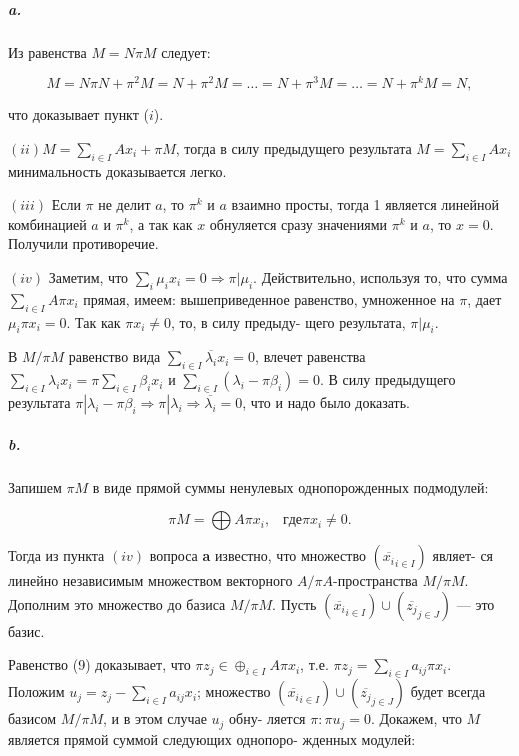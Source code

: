 \documentclass{mai_book}
\begin{document}
{\subparagraph{a.} Из равенства $M = N \pi M$ следует:

\begin{equation*}
M = N \pi N + \pi^{2}M = N + \pi^{2}M =\dots= N + \pi^{3}M=\dots= N + \pi^{k}M = N,
\end{equation*}

\noindent что доказывает пункт ($i$).

$(ii) M = \sum_{i \in I}Ax_{i} + \pi M$, тогда в силу предыдущего результата
$M = \sum_{i \in I}Ax_{i}$ минимальность доказывается легко.

$(iii)$ Если $\pi$ не делит $a$, то $\pi^{k}$ и $a$ взаимно просты, тогда 1 является
линейной комбинацией $a$ и $\pi^{k}$, а так как $x$ обнуляется сразу значениями
$\pi^{k}$ и $a$, то $x = 0$. Получили противоречие.

$(iv)$ Заметим, что $\sum_{i}\mu_{i}x_{i} = 0 \Rightarrow \pi | \mu_{i}$. Действительно, используя
то, что сумма $\sum_{i \in I}A\pi x_{i}$ прямая, имеем: вышеприведенное равенство,
умноженное на $\pi$, дает $\mu_{i}\pi x_{i} = 0$. Так как $\pi x_{i} \neq 0$, то, в силу предыду-
щего результата, $\pi | \mu_{i}$.

В $M/\pi M$ равенство вида $\sum_{i \in I}\overline{\lambda_{i}}x_{i} = 0$, влечет равенства
$\sum_{i \in I}\lambda_{i}x_{i} = \pi\sum_{i \in I}\beta_{i}x_{i}$ и $\sum_{i \in I}(\lambda_{i} - \pi\beta_{i}) = 0$. В силу предыдущего
результата $\pi |\lambda_{i} - \pi\beta_{i} \Rightarrow \pi| \lambda_{i} \Rightarrow \overline{\lambda_{i}} = 0$, что и надо было доказать.

\subparagraph{b.} Запишем $\pi M$ в виде прямой суммы ненулевых однопорожденных
подмодулей:

\begin{equation}
\pi M = \bigoplus A\pi x_{i},\;\;\; где \pi x_{i} \neq 0.
\end{equation}

\noindent Тогда из пункта $(iv)$ вопроса {\bf a} известно, что множество $(\overline{x_{i}}_{i \in I})$ являет-
ся линейно независимым множеством векторного $A/\pi A$-пространства
$M/\pi M$. Дополним это множество до базиса $M/\pi M$. Пусть
$(\overline{x_{i}}_{i \in I}) \cup (\overline{z_{j}}_{j \in J})$ --- это базис.

Равенство (9) доказывает, что $\pi z_{j} \in \oplus_{i \in I}A\pi x_{i}$, т.е.
$\pi z_{j} = \sum_{i \in I}a_{ij}\pi x_{i}$. Положим $u_{j} = z_{j} - \sum_{i \in I}a_{ij}x_{i}$; множество
$(\overline{x_{i}}_{i \in I}) \cup (\overline{z_{j}}_{j \in J})$ будет всегда базисом $M/\pi M$, и в этом случае $u_{j}$ обну-
ляется $\pi: \pi u_{j} = 0$.
Докажем, что $M$ является прямой суммой следующих однопоро-
жденных модулей:

}
\end{document}
